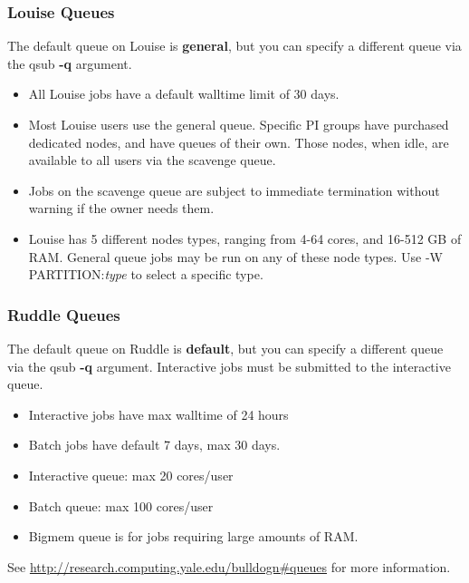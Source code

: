 \documentclass[10pt]{beamer}
\begin{document}
\begin{frame}
\frametitle{Louise Queues}
The default queue on Louise is \textbf{general}, but you can specify
a different queue via the qsub \textbf{-q} argument.

\begin{itemize}
\item All Louise jobs have a default walltime limit of 30 days.  
\item Most Louise users use the general queue.  Specific PI groups have purchased dedicated nodes, and have 
queues of their own.  Those nodes, when idle, are available to all users via the scavenge queue.  
\item Jobs on the scavenge queue are subject to immediate termination without warning if the owner needs them.
\item Louise has 5 different nodes types, ranging from 4-64 cores, and 16-512 GB of RAM.  General queue jobs may be run on any
of these node types.  Use -W PARTITION:\textit{type} to select a specific type. 
\end{itemize}

\end{frame}

\begin{frame}
\frametitle{Ruddle Queues}
The default queue on Ruddle is \textbf{default}, but you can specify
a different queue via the qsub \textbf{-q} argument.  Interactive jobs
must be submitted to the interactive queue.

\begin{itemize}
\item Interactive jobs have max walltime of 24 hours
\item Batch jobs have default 7 days, max 30 days.
\item Interactive queue: max 20 cores/user
\item Batch queue: max 100 cores/user
\item Bigmem queue is for jobs requiring large amounts of RAM.
\end{itemize}

See \url{http://research.computing.yale.edu/bulldogn\#queues} for more information.

\end{frame}
\end{document}
